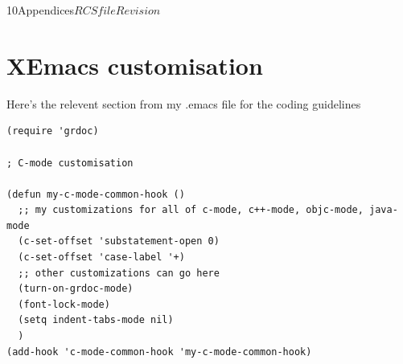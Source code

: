 %   

\begin{cactuspart}{10}{Appendices}{$RCSfile$}{$Revision$}
\renewcommand{\thepage}{\Alph{part}\arabic{page}}

\chapter{XEmacs customisation}

Here's the relevent section from my .emacs file for the coding guidelines

\begin{verbatim}
(require 'grdoc)

; C-mode customisation

(defun my-c-mode-common-hook ()
  ;; my customizations for all of c-mode, c++-mode, objc-mode, java-mode
  (c-set-offset 'substatement-open 0)
  (c-set-offset 'case-label '+)
  ;; other customizations can go here
  (turn-on-grdoc-mode)
  (font-lock-mode)
  (setq indent-tabs-mode nil)
  )
(add-hook 'c-mode-common-hook 'my-c-mode-common-hook)
\end{verbatim}


\end{cactuspart}
